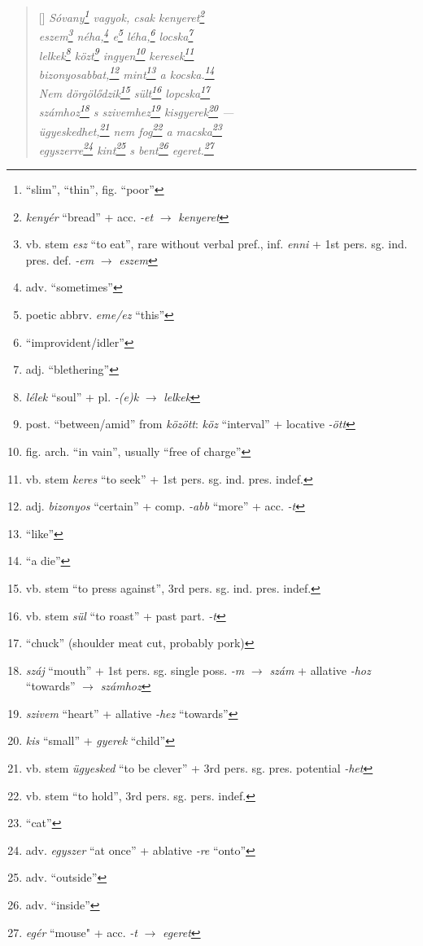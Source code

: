 \documentclass[a4paper,12pt,twoside,final]{book}
\begin{document}
\begin{verse}[\versewidth]
  \it
  Sóvany\footnote{``slim'', ``thin'', fig. ``poor''} vagyok, csak
  kenyeret\footnote{\emph{kenyér} ``bread'' + acc. \emph{-et}
  $\rightarrow$ \emph{kenyeret}} \\
  eszem\footnote{vb. stem \emph{esz} ``to eat'', rare without verbal
  pref., inf. \emph{enni} + 1st pers. sg. ind. pres. def. \emph{-em}
  $\rightarrow$ \emph{eszem}} néha,\footnote{adv. ``sometimes''} e\footnote{poetic
  abbrv. \emph{eme/ez} ``this''} léha,\footnote{``improvident/idler''}
  locska\footnote{adj. ``blethering''} \\
  lelkek\footnote{\emph{lélek} ``soul'' +
  pl. \emph{-(e)k} $\rightarrow$ \emph{lelkek}}
  közt\footnote{post. ``between/amid'' from \emph{között}: \emph{köz}
  ``interval'' + locative \emph{-ött}} ingyen\footnote{fig. arch. ``in
  vain'', usually ``free of charge''} keresek\footnote{vb. stem
  \emph{keres} ``to seek'' + 1st pers. sg. ind. pres. indef.} \\
  bizonyosabbat,\footnote{adj. \emph{bizonyos} ``certain'' +
  comp. \emph{-abb} ``more'' + acc. \emph{-t}} mint\footnote{``like''} a
  kocska.\footnote{``a die''} \\
  Nem dörgölődzik\footnote{vb. stem ``to press against'', 3rd
  pers. sg. ind. pres. indef.} sült\footnote{vb. stem \emph{sül} ``to
  roast''  + past part. \emph{-t}} lopcska\footnote{``chuck''
  (shoulder meat cut, probably pork)} \\
  számhoz\footnote{\emph{száj} ``mouth'' + 1st
  pers. sg. single poss. \emph{-m} $\rightarrow$ \emph{szám} +
  allative \emph{-hoz} ``towards'' $\rightarrow$ \emph{számhoz}} s
  szivemhez\footnote{\emph{szivem} ``heart'' +
  allative \emph{-hez} ``towards''} kisgyerek\footnote{\emph{kis} ``small'' +
  \emph{gyerek} ``child''} --- \\
  ügyeskedhet,\footnote{vb. stem \emph{ügyesked} ``to be clever'' +
  3rd pers. sg. pres. potential \emph{-het}} nem fog\footnote{vb. stem
  ``to hold'', 3rd pers. sg. pers. indef.} a macska\footnote{``cat''} \\
  egyszerre\footnote{adv. \emph{egyszer} ``at once'' +
  ablative \emph{-re} ``onto''} kint\footnote{adv. ``outside''} s
  bent\footnote{adv. ``inside''} egeret.\footnote{\emph{egér}
  ``mouse" + acc. \emph{-t} $\rightarrow$ \emph{egeret}}
\end{verse}

\newpage

\end{document}
